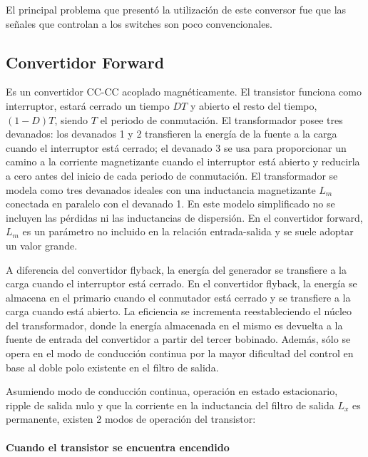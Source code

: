 El principal problema que presentó la utilización de este conversor fue que las señales que controlan a los switches son poco convencionales.

\subsection{Convertidor Forward}

Es un convertidor CC-CC acoplado magnéticamente. El transistor funciona como interruptor, estará cerrado un tiempo $DT$ y abierto el resto del tiempo,
$(1 - D)T$, siendo $T$ el periodo de conmutación. 
El transformador posee tres devanados: los devanados 1 y 2 transfieren la energía de la
fuente a la carga cuando el interruptor está cerrado; el devanado 3 se usa para proporcionar un
camino a la corriente magnetizante cuando el interruptor está abierto y reducirla a cero antes del
inicio de cada periodo de conmutación. El transformador se modela como tres devanados ideales
con una inductancia magnetizante $L_m$ conectada en paralelo con el devanado 1. En este modelo simplificado no se incluyen las pérdidas ni las inductancias de dispersión.
En el convertidor forward, $L_m$ es un parámetro no incluido en la relación entrada-salida y se suele adoptar un valor grande.

A diferencia del convertidor flyback, la energía del generador se transfiere a la carga cuando el interruptor
está cerrado. En el convertidor flyback, la energía se almacena en el primario cuando el conmutador
está cerrado y se transfiere a la carga cuando está abierto. 
La eficiencia se incrementa reestableciendo el núcleo del transformador, 
donde la energía almacenada en el mismo es devuelta a la fuente de entrada del convertidor a partir del tercer bobinado. 
Además, sólo se opera en el modo de conducción continua por la mayor dificultad del control en base al doble polo existente en el filtro de salida. 

Asumiendo modo de conducción continua, operación en estado estacionario, ripple de salida nulo 
y que la corriente en la inductancia del filtro de salida $L_x$ es permanente, existen 2 modos de operación del transistor:


\paragraph{Cuando el transistor se encuentra encendido}

